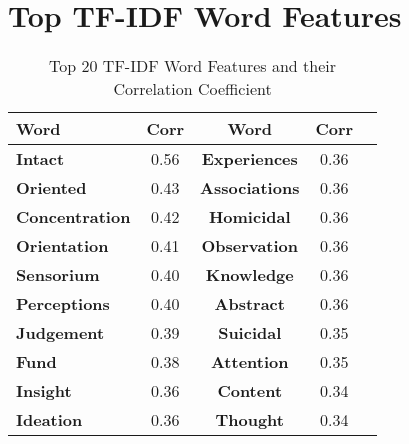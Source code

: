 \documentclass[pmlr,twocolumn,10pt]{jmlr} %
\begin{document}
\section{Top TF-IDF Word Features} \label{app:app3}
\begin{table}[hbtp]
    \begin{tabular}{lcccc}
    \toprule 
    \bfseries Word & \bfseries Corr & \bfseries Word & \bfseries Corr \\
    \midrule
    
    \bfseries Intact &  0.56 & \bfseries Experiences & 0.36 \\
    \bfseries Oriented &  0.43 & \bfseries Associations & 0.36 \\ 
    \bfseries Concentration &  0.42 & \bfseries Homicidal & 0.36 \\ 
    \bfseries Orientation &  0.41 & \bfseries Observation & 0.36 \\
    \bfseries Sensorium &  0.40 & \bfseries Knowledge & 0.36 \\ 
    \bfseries Perceptions &  0.40 & \bfseries Abstract & 0.36 \\
    \bfseries Judgement &  0.39 & \bfseries Suicidal & 0.35 \\
    \bfseries Fund & 0.38 & \bfseries Attention & 0.35 \\
    \bfseries Insight &  0.36 & \bfseries Content & 0.34 \\ 
    \bfseries Ideation &  0.36 & \bfseries Thought & 0.34  \\  
    
    \bottomrule
  \end{tabular}
  {\caption{Top 20 TF-IDF Word Features and their Correlation Coefficient}}
\end{table}


    
\end{document}
